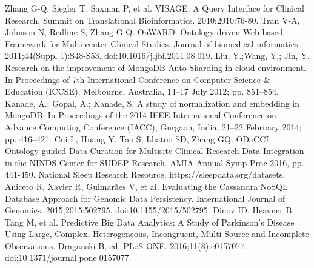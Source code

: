 \documentclass{amia}
\begin{document}
{\begin{thebibliography}{1}
Zhang G-Q, Siegler T, Saxman P, et al. VISAGE: A Query Interface for Clinical Research. Summit on Translational Bioinformatics. 2010;2010:76-80.
Tran V-A, Johnson N, Redline S, Zhang G-Q. OnWARD: Ontology-driven Web-based Framework for Multi-center Clinical Studies. Journal of biomedical informatics. 2011;44(Suppl 1):S48-S53. doi:10.1016/j.jbi.2011.08.019.
Liu, Y.;Wang, Y.; Jin, Y. Research on the improvement of MongoDB Auto-Sharding in cloud environment. In Proceedings of 7th International Conference on Computer Science \& Education (ICCSE), Melbourne, Australia, 14–17 July 2012; pp. 851–854.
Kanade, A.; Gopal, A.; Kanade, S. A study of normalization and embedding in MongoDB. In Proceedings of the 2014 IEEE International Conference on Advance Computing Conference (IACC), Gurgaon, India, 21–22 February 2014; pp. 416–421.
Cui L, Huang Y, Tao S, Lhatoo SD, Zhang GQ. ODaCCI: Ontology-guided Data Curation for Multisite Clinical Research Data Integration in the NINDS Center for SUDEP Research. AMIA Annual Symp Proc 2016, pp. 441-450.
National Sleep Research Resource. https://sleepdata.org/datasets.
Aniceto R, Xavier R, Guimarães V, et al. Evaluating the Cassandra NoSQL Database Approach for Genomic Data Persistency. International Journal of Genomics. 2015;2015:502795. doi:10.1155/2015/502795.
Dinov ID, Heavner B, Tang M, et al. Predictive Big Data Analytics: A Study of Parkinson’s Disease Using Large, Complex, Heterogeneous, Incongruent, Multi-Source and Incomplete Observations. Draganski B, ed. PLoS ONE. 2016;11(8):e0157077. doi:10.1371/journal.pone.0157077.

\end{thebibliography}
}
\end{document}
